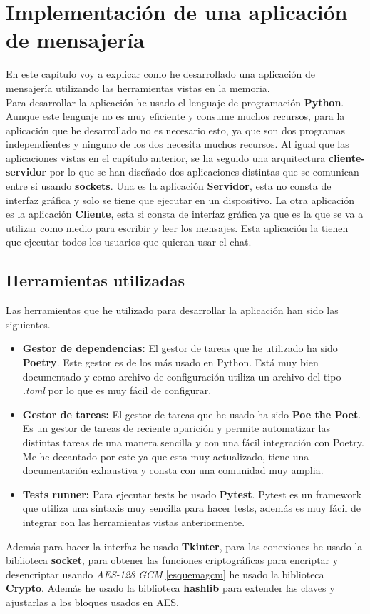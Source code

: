 \chapter{Implementación de una aplicación de mensajería}

En este capítulo voy a explicar como he desarrollado una aplicación de mensajería utilizando las herramientas vistas en la memoria.\\
Para desarrollar la aplicación he usado el lenguaje de programación \textbf{Python}. Aunque este lenguaje no es muy eficiente y consume muchos recursos, para la aplicación que he desarrollado no es necesario esto, ya que son dos programas independientes y ninguno de los dos necesita muchos recursos. Al igual que las aplicaciones vistas en el capítulo anterior, se ha seguido una arquitectura \textbf{cliente-servidor} por lo que se han diseñado dos aplicaciones distintas que se comunican entre si usando \textbf{sockets}. Una es la aplicación \textbf{Servidor}, esta no consta de interfaz gráfica y solo se tiene que ejecutar en un dispositivo. La otra aplicación es la aplicación \textbf{Cliente}, esta si consta de interfaz gráfica ya que es la que se va a utilizar como medio para escribir y leer los mensajes. Esta aplicación la tienen que ejecutar todos los usuarios que quieran usar el chat.

\section{Herramientas utilizadas}
Las herramientas que he utilizado para desarrollar la aplicación han sido las siguientes.
\begin{itemize}
	\item \textbf{Gestor de dependencias:} El gestor de tareas que he utilizado ha sido \textbf{Poetry}. Este gestor es de los más usado en Python. Está muy bien documentado y como archivo de configuración utiliza un archivo del tipo \emph{.toml} por lo que es muy fácil de configurar. 
	\item \textbf{Gestor de tareas:} El gestor de tareas que he usado ha sido \textbf{Poe the Poet}. Es un gestor de tareas de reciente aparición y permite automatizar las distintas tareas de una manera sencilla y con una fácil integración con Poetry. Me he decantado por este ya que esta muy actualizado, tiene una documentación exhaustiva y consta con una comunidad muy amplia.
	\item \textbf{Tests runner:} Para ejecutar tests he usado \textbf{Pytest}. Pytest es un framework que utiliza una sintaxis muy sencilla para hacer tests, además es muy fácil de integrar con las herramientas vistas anteriormente.
\end{itemize}
Además para hacer la interfaz he usado \textbf{Tkinter}, para las conexiones he usado la biblioteca \textbf{socket}, para obtener las funciones criptográficas para encriptar y desencriptar usando \emph{AES-128 GCM} \ref{esquemagcm} he usado la biblioteca \textbf{Crypto}. Además he usado la biblioteca \textbf{hashlib} para extender las claves y ajustarlas a los bloques usados en AES.

